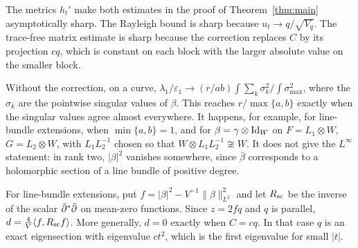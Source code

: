 \begin{remark}
The metrics $h_t'$ make both estimates in the proof of
Theorem~\ref{thm:main} asymptotically sharp. The Rayleigh bound is sharp
because $u_t\to q/\sqrt{V_q}$. The trace-free matrix estimate is sharp because
the correction replaces $C$ by its projection $cq$, which is constant on each
block with the larger absolute value on the smaller block.

Without the correction, on a curve,
$\lambda_1/\varepsilon_1\to(r/ab)\int\sum_k\sigma_k^2/\int\sigma_{\max}^2$,
where the $\sigma_k$ are the pointwise singular values of $\beta$. This
reaches $r/\max\{a,b\}$ exactly when the singular values agree almost
everywhere. It happens, for example, for line-bundle extensions, when
$\min\{a,b\}=1$, and for $\beta=\gamma\otimes\operatorname{Id}_W$ on
$F=L_1\otimes W$, $G=L_2\otimes W$, with $L_1L_2^{-1}$ chosen so that
$W\otimes L_1L_2^{-1}\not\cong W$. It does not give the $L^\infty$
statement: in rank two, $|\beta|^2$ vanishes somewhere, since $\bar\beta$
corresponds to a holomorphic section of a line bundle of positive degree.

For line-bundle extensions, put $f=|\beta|^2-V^{-1}\lVert\beta\rVert_{L^2}^2$
and let $R_{\rm sc}$ be the inverse of the scalar $\bar\partial^*\bar\partial$ on mean-zero
functions. Since $z=2fq$ and $q$ is parallel,
$d=\frac4V\langle f,R_{\rm sc}f\rangle$. More generally, $d=0$ exactly when
$C=cq$. In that case $q$ is an exact eigensection with eigenvalue $ct^2$,
which is the first eigenvalue for small $|t|$.
\end{remark}
